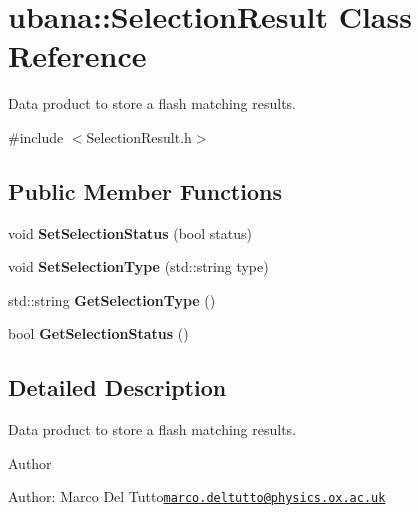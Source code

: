 \hypertarget{classubana_1_1SelectionResult}{\section{ubana\-:\-:Selection\-Result Class Reference}
\label{classubana_1_1SelectionResult}
}


Data product to store a flash matching results.  




{\ttfamily \#include $<$Selection\-Result.\-h$>$}

\subsection*{Public Member Functions}
\begin{DoxyCompactItemize}
\item 
\hypertarget{classubana_1_1SelectionResult_a1e042345d4fad423d897c944afb4a2c2}{void {\bfseries Set\-Selection\-Status} (bool status)}\label{classubana_1_1SelectionResult_a1e042345d4fad423d897c944afb4a2c2}

\item 
\hypertarget{classubana_1_1SelectionResult_a44cacfd834cb799f18938de7134c0086}{void {\bfseries Set\-Selection\-Type} (std\-::string type)}\label{classubana_1_1SelectionResult_a44cacfd834cb799f18938de7134c0086}

\item 
\hypertarget{classubana_1_1SelectionResult_ac1b21a0690e27bd01ad9ac20afa2d161}{std\-::string {\bfseries Get\-Selection\-Type} ()}\label{classubana_1_1SelectionResult_ac1b21a0690e27bd01ad9ac20afa2d161}

\item 
\hypertarget{classubana_1_1SelectionResult_a2a45390dcb4c138003158a76ac94a8a8}{bool {\bfseries Get\-Selection\-Status} ()}\label{classubana_1_1SelectionResult_a2a45390dcb4c138003158a76ac94a8a8}

\end{DoxyCompactItemize}


\subsection{Detailed Description}
Data product to store a flash matching results. 

\begin{DoxyAuthor}{Author}

\end{DoxyAuthor}
\begin{DoxyParagraph}{Author\-:}
Marco Del Tutto\href{mailto:marco.deltutto@physics.ox.ac.uk}{\tt marco.\-deltutto@physics.\-ox.\-ac.\-uk} 
\end{DoxyParagraph}


